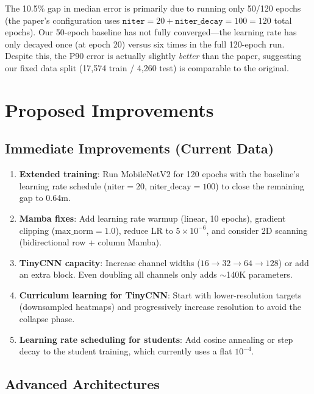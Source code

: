 \documentclass[11pt,a4paper]{article}
\begin{document}
The 10.5\% gap in median error is primarily due to running only 50/120 epochs (the paper's configuration uses $\texttt{niter}=20 + \texttt{niter\_decay}=100 = 120$ total epochs). Our 50-epoch baseline has not fully converged---the learning rate has only decayed once (at epoch 20) versus six times in the full 120-epoch run. Despite this, the P90 error is actually slightly \textit{better} than the paper, suggesting our fixed data split (17,574 train / 4,260 test) is comparable to the original.

\section{Proposed Improvements}

\subsection{Immediate Improvements (Current Data)}

\begin{enumerate}[leftmargin=*]
    \item \textbf{Extended training}: Run MobileNetV2 for 120 epochs with the baseline's learning rate schedule ($\text{niter}=20$, $\text{niter\_decay}=100$) to close the remaining gap to 0.64m.

    \item \textbf{Mamba fixes}: Add learning rate warmup (linear, 10 epochs), gradient clipping ($\text{max\_norm}=1.0$), reduce LR to $5\times10^{-6}$, and consider 2D scanning (bidirectional row + column Mamba).

    \item \textbf{TinyCNN capacity}: Increase channel widths ($16\to32\to64\to128$) or add an extra block. Even doubling all channels only adds $\sim$140K parameters.

    \item \textbf{Curriculum learning for TinyCNN}: Start with lower-resolution targets (downsampled heatmaps) and progressively increase resolution to avoid the collapse phase.

    \item \textbf{Learning rate scheduling for students}: Add cosine annealing or step decay to the student training, which currently uses a flat $10^{-4}$.
\end{enumerate}

\subsection{Advanced Architectures}
\end{document}

